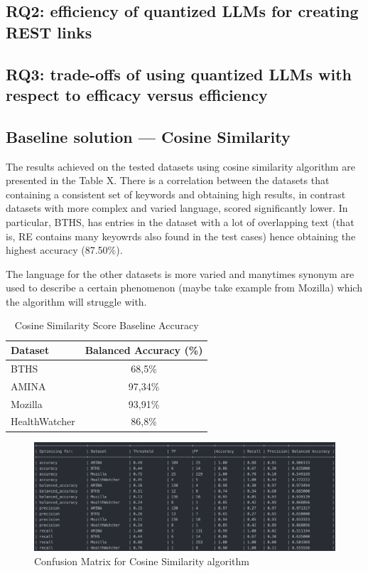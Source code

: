 \documentclass[conference]{IEEEtran}
\begin{document}
\subsection{\textbf{RQ2:} efficiency of quantized LLMs for creating REST links}

\subsection{\textbf{RQ3:} trade-offs of using quantized LLMs with respect to efficacy versus efficiency}

\subsection{Baseline solution --- Cosine Similarity}

The results achieved on the tested datasets using cosine similarity algorithm are presented in the Table X. There is a correlation between the datasets that containing a consistent set of keywords and obtaining high results, in contrast datasets with more complex and varied language, scored significantly lower. In particular, BTHS, has entries in the dataset with a lot of overlapping text (that is, RE contains many keyowrds also found in the test cases) hence obtaining the highest accuracy (87.50\%). 

The language for the other datasets is more varied and manytimes synonym are used to describe a certain phenomenon (maybe take example from Mozilla) which the algorithm will struggle with.

\begin{table}[h]
    \centering
    \caption{Cosine Similarity Score Baseline Accuracy\label{tab:cosine_baseline_accuracy}}
    \renewcommand{\arraystretch}{1.2}
    \begin{tabular}{||l|c||}
    \hline
    \textbf{Dataset} & \textbf{Balanced Accuracy (\%)} \\
    \hline
    BTHS & 68,5\% \\
    AMINA & 97,34\% \\
    Mozilla & 93,91\% \\
    HealthWatcher & 86,8\% \\
    \hline
    \end{tabular}
\end{table}


\begin{figure}[H]
    \centering
    \includegraphics[width=0.99\columnwidth]{images/cosine_confusion_matrix.png}
    \caption{Confusion Matrix for Cosine Similarity algorithm}
    \label{fig:confution_cosine}
\end{figure}
\end{document}
